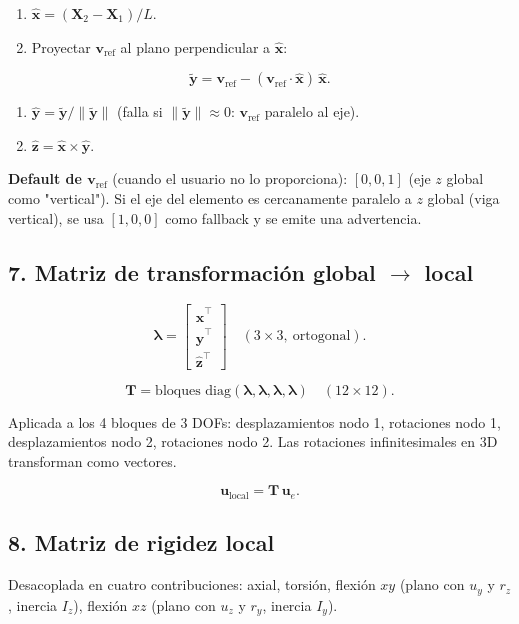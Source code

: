 \documentclass[11pt,letterpaper,oneside]{report}
\begin{document}
\begin{enumerate}
  \item $\hat{\mathbf x} = (\mathbf X_2 - \mathbf X_1)/L$.
  \item Proyectar $\mathbf v_{\text{ref}}$ al plano perpendicular a $\hat{\mathbf x}$:
\end{enumerate}
   \[
\tilde{\mathbf y} = \mathbf v_{\text{ref}} - (\mathbf v_{\text{ref}} \cdot \hat{\mathbf x})\,\hat{\mathbf x}.
\]
\begin{enumerate}
  \item $\hat{\mathbf y} = \tilde{\mathbf y}/\|\tilde{\mathbf y}\|$ (falla si $\|\tilde{\mathbf y}\| \approx 0$: $\mathbf v_{\text{ref}}$ paralelo al eje).
  \item $\hat{\mathbf z} = \hat{\mathbf x} \times \hat{\mathbf y}$.
\end{enumerate}

\textbf{Default de $\mathbf v_{\text{ref}}$} (cuando el usuario no lo proporciona): $[0, 0, 1]$ (eje $z$ global como "vertical"). Si el eje del elemento es cercanamente paralelo a $z$ global (viga vertical), se usa $[1, 0, 0]$ como fallback y se emite una advertencia.

\subsection{7. Matriz de transformación global \ensuremath{\to} local}
\[
\boldsymbol{\lambda} = \begin{bmatrix} \hat{\mathbf x}^\top \\ \hat{\mathbf y}^\top \\ \hat{\mathbf z}^\top \end{bmatrix} \quad (3\times 3,\ \text{ortogonal}).
\]

\[
\mathbf T = \text{bloques diag}(\boldsymbol{\lambda}, \boldsymbol{\lambda}, \boldsymbol{\lambda}, \boldsymbol{\lambda}) \quad (12\times 12).
\]

Aplicada a los 4 bloques de 3 DOFs: desplazamientos nodo 1, rotaciones nodo 1, desplazamientos nodo 2, rotaciones nodo 2. Las rotaciones infinitesimales en 3D transforman como vectores.

\[
\mathbf u_{\text{local}} = \mathbf T\,\mathbf u_e.
\]

\subsection{8. Matriz de rigidez local}
Desacoplada en cuatro contribuciones: axial, torsión, flexión $xy$ (plano con $u_y$ y $r_z$, inercia $I_z$), flexión $xz$ (plano con $u_z$ y $r_y$, inercia $I_y$).
\end{document}
